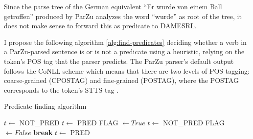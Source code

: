 Since the parse tree of the German equivalent ``Er wurde von einem Ball getroffen'' produced
by ParZu analyzes the word ``wurde'' as root of the tree, it does not make sense
to forward this as predicate to DAMESRL.




I propose the following algorithm \ref{alg:find-predicates} deciding whether a verb in a
ParZu-parsed sentence is or is not a predicate using a heuristic, relying on the token's
POS tag that the parser predicts. The ParZu parser's default output follows the CoNLL
scheme \citep{buchholz2006conll} which means that there are two levels of POS tagging:
coarse-grained (CPOSTAG) and fine-grained (POSTAG), where the POSTAG corresponds to the
token's STTS tag \citep{schiller1999guidelines}.

\begin{algorithm}
\caption{Predicate finding algorithm}
\label{alg:find-predicates}
	\begin{algorithmic}[1]
			\STATE $t \leftarrow$ NOT\_PRED
		\ELSE
				\STATE $t \leftarrow$ PRED
			\ELSE
				\STATE FLAG $\leftarrow True$
						\STATE $t \leftarrow$ NOT\_PRED
						\STATE FLAG $\leftarrow False$
						\STATE \textbf{break}
					\ENDIF
				\ENDFOR
				\IF{FLAG $= True$}
					\STATE $t \leftarrow$ PRED
				\ENDIF
			\ENDIF
		\ENDIF
	\ENDFOR
\end{algorithmic}
\end{algorithm}


